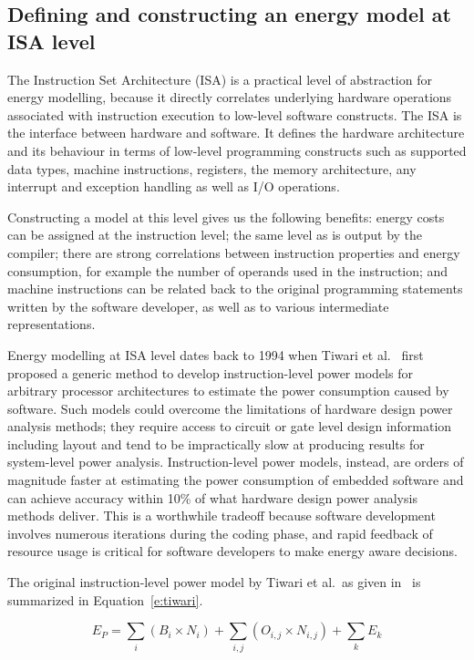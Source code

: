 \subsection{Defining and constructing an energy model at ISA level}

The Instruction Set Architecture (ISA) is a practical level of abstraction for energy
modelling, because it directly correlates underlying hardware operations associated with instruction execution to low-level software constructs. The ISA is the interface between hardware and software. It defines the hardware architecture and its behaviour in terms of low-level programming constructs such as supported data types, machine instructions, registers, the memory architecture, any interrupt and exception handling as well as I/O operations. 

Constructing a model at this level gives us the following benefits: energy
costs can be assigned at the instruction level; the same level as is output by
the compiler; there are strong correlations between instruction properties and
energy consumption, for example the number of operands used in the instruction;
and machine instructions can be related back to the original programming
statements written by the software developer, as well as to various
intermediate representations. 

Energy modelling at ISA level dates back to 1994 when Tiwari et
al.~\cite{Tiwari-embedded-1994} first proposed a
generic method to develop instruction-level power models for arbitrary
processor architectures to estimate the power consumption caused by software.
Such models could overcome the limitations of hardware design power analysis
methods; they require access to circuit or gate level design information
including layout and tend to be impractically slow at producing results for
system-level power analysis. Instruction-level power models, instead, are
orders of magnitude faster at estimating the power consumption of embedded
software and can achieve accuracy within 10\% of what hardware design power
analysis methods deliver. This is a worthwhile tradeoff because software
development involves numerous iterations during the coding phase, and rapid
feedback of resource usage is critical for software developers to make energy
aware decisions.

The original instruction-level power model by Tiwari et al.\ as given in~\cite{TiwariWolfeInstructionLevelPowerAnalysi:1996} is summarized in Equation~\ref{e:tiwari}.

\begin{equation}\label{e:tiwari}
E_P = \sum_i (B_i \times N_i) + \sum_{i,j} (O_{i,j} \times N_{i,j}) + \sum_k E_k
\end{equation}

